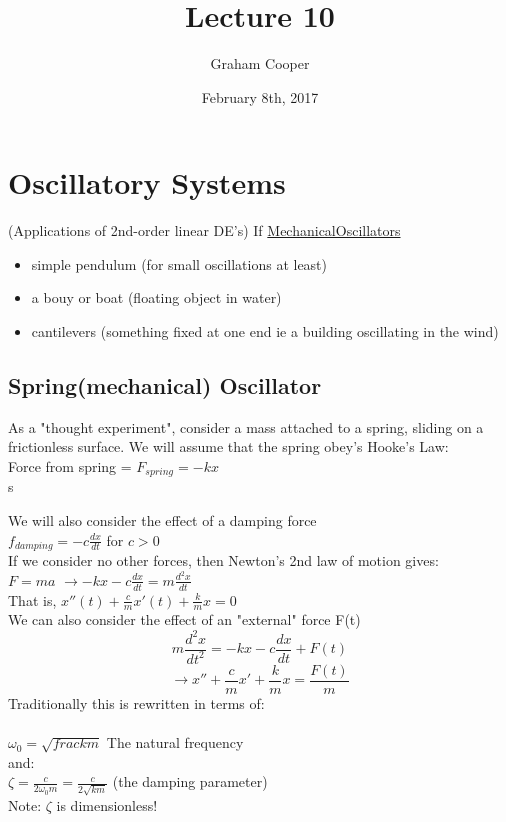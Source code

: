 \documentclass[12pt]{article}
\title{\vspace{-15ex}Lecture 10\vspace{-1ex}}
\date{February 8th, 2017}
\author{Graham Cooper}
\begin{document}
	\maketitle
	
	\section*{Oscillatory Systems}
	(Applications of 2nd-order linear DE's)
	If \underline{MechanicalOscillators}
	\begin{itemize}
		\item simple pendulum (for small oscillations at least)
		\item a bouy or boat (floating object in water)
		\item cantilevers (something fixed at one end ie a building oscillating in the wind)
	\end{itemize}
	
	\subsection*{Spring(mechanical) Oscillator}
	As a "thought experiment", consider a mass attached to a spring, sliding on a frictionless surface. We will assume that the spring obey's Hooke's Law:\\
	Force from spring = $F_{spring} = -kx$\\s
	
	We will also consider the effect of a damping force\\
	$f_{damping} = -c\frac{dx}{dt}$ for $c > 0$\\
	If we consider no other forces, then Newton's 2nd law of motion gives:\\
	$F = ma$
	$\rightarrow -kx - c\frac{dx}{dt} = m\frac{d^2x}{dt}$\\
	
	That is, $x''(t) + \frac{c}{m}x'(t) + \frac{k}{m}x = 0$\\
	
	We can also consider the effect of an "external" force F(t)\\
	$$m\frac{d^2x}{dt^2} = -kx-c\frac{dx}{dt} + F(t)$$
	$$\rightarrow x'' + \frac{c}{m}x' + \frac{k}{m}x = \frac{F(t)}{m}$$
	Traditionally this is rewritten in terms of:\\\\
	$\omega_0 = \sqrt{frac{k}{m}}$ The natural frequency\\
	and:\\
	$\zeta = \frac{c}{2\omega_0m} = \frac{c}{2\sqrt{km}}$ (the damping parameter)\\
	Note: $\zeta$ is dimensionless!\\
	
\end{document}
